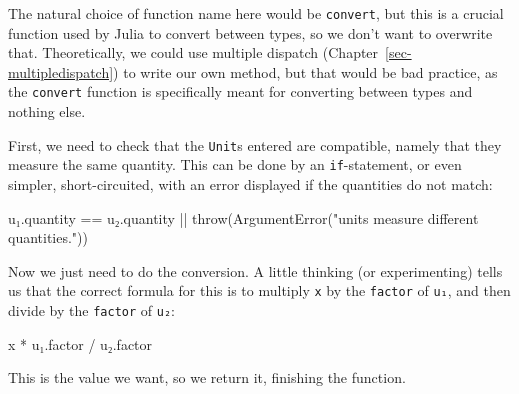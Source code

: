 \documentclass[
  letterpaper,
  DIV=11,
  numbers=noendperiod]{scrreprt}
\newenvironment{Shaded}{\begin{snugshade}}{\end{snugshade}}
\newcommand{\FunctionTok}[1]{\textcolor[rgb]{0.28,0.35,0.67}{#1}}
\newcommand{\NormalTok}[1]{\textcolor[rgb]{0.00,0.23,0.31}{#1}}
\newcommand{\OperatorTok}[1]{\textcolor[rgb]{0.37,0.37,0.37}{#1}}
\newcommand{\StringTok}[1]{\textcolor[rgb]{0.13,0.47,0.30}{#1}}
\begin{document}
\begin{tcolorbox}[enhanced jigsaw, toprule=.15mm, opacitybacktitle=0.6, leftrule=.75mm, breakable, coltitle=black, bottomrule=.15mm, colbacktitle=quarto-callout-warning-color!10!white, bottomtitle=1mm, rightrule=.15mm, title=\textcolor{quarto-callout-warning-color}{\faExclamationTriangle}\hspace{0.5em}{Warning}, colframe=quarto-callout-warning-color-frame, left=2mm, colback=white, opacityback=0, arc=.35mm, toptitle=1mm, titlerule=0mm]

The natural choice of function name here would be \texttt{convert}, but
this is a crucial function used by Julia to convert between types, so we
don't want to overwrite that. Theoretically, we could use multiple
dispatch (Chapter~\ref{sec-multipledispatch}) to write our own method,
but that would be bad practice, as the \texttt{convert} function is
specifically meant for converting between types and nothing else.

\end{tcolorbox}

First, we need to check that the \texttt{Unit}s entered are compatible,
namely that they measure the same quantity. This can be done by an
\texttt{if}-statement, or even simpler, short-circuited, with an error
displayed if the quantities do not match:

\begin{Shaded}
\begin{Highlighting}[]
\NormalTok{u₁.quantity }\OperatorTok{==}\NormalTok{ u₂.quantity }\OperatorTok{||} \FunctionTok{throw}\NormalTok{(}\FunctionTok{ArgumentError}\NormalTok{(}\StringTok{"units measure different quantities."}\NormalTok{))}
\end{Highlighting}
\end{Shaded}

Now we just need to do the conversion. A little thinking (or
experimenting) tells us that the correct formula for this is to multiply
\texttt{x} by the \texttt{factor} of \texttt{u₁}, and then divide by the
\texttt{factor} of \texttt{u₂}:

\begin{Shaded}
\begin{Highlighting}[]
\NormalTok{x }\OperatorTok{*}\NormalTok{ u₁.factor }\OperatorTok{/}\NormalTok{ u₂.factor}
\end{Highlighting}
\end{Shaded}

This is the value we want, so we return it, finishing the function.
\end{document}
